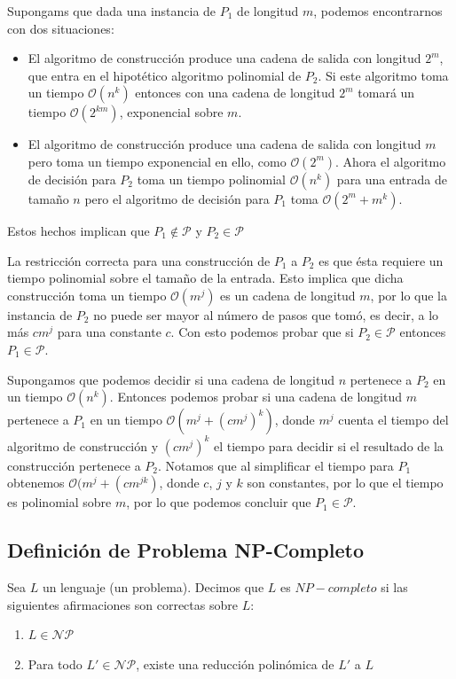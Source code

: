 \documentclass[a4paper]{article}
\begin{document}
Supongams que dada una instancia de $P_1$ de longitud $m$, podemos encontrarnos
con dos situaciones:
\begin{itemize}
  \item El algoritmo de construcción produce una cadena de salida con longitud
  $2^{m}$, que entra en el hipotético algoritmo polinomial de $P_2$. Si este
  algoritmo toma un tiempo $\mathcal{O}(n^k)$ entonces con una cadena de
  longitud $2^{m}$ tomará un tiempo $\mathcal{O}(2^{km})$, exponencial sobre $m$.
  \item El algoritmo de construcción produce una cadena de salida con longitud
  $m$ pero toma un tiempo exponencial en ello, como $\mathcal{O}(2^m)$. Ahora el
  algoritmo de decisión para $P_2$ toma un tiempo polinomial $\mathcal{O}(n^k)$
  para una entrada de tamaño $n$ pero el algoritmo de decisión para $P_1$ toma
  $\mathcal{O}(2^{m} + m^{k})$.
\end{itemize}
Estos hechos implican que $P_1 \notin \mathcal{P}$ y $P_2 \in \mathcal{P}$

La restricción correcta para una construcción de $P_1$ a $P_2$ es que  ésta requiere
un tiempo polinomial sobre el tamaño de la entrada.
Esto implica que dicha construcción toma un tiempo $\mathcal{O}(m^{j})$ es un
cadena de longitud $m$, por lo que la instancia de $P_2$ no puede ser mayor al
número de pasos que tomó, es decir, a lo más $cm^{j}$ para una constante $c$.
Con esto podemos probar que si $P_2 \in \mathcal{P}$ entonces $P_1 \in \mathcal{P}$.

Supongamos que podemos decidir si una cadena de longitud $n$ pertenece a $P_2$
en un tiempo $\mathcal{O}(n^{k})$. Entonces podemos probar si una cadena de
longitud $m$ pertenece a $P_1$ en un tiempo $\mathcal{O}(m^j + (cm^j)^k)$,
donde $m^j$ cuenta el tiempo del algoritmo de construcción y $(cm^j)^k$ el
tiempo para decidir si el resultado de la construcción pertenece a $P_2$.
Notamos que al simplificar el tiempo para $P_1$ obtenemos
$\mathcal{O}(m^j + (cm^{jk})$, donde $c$, $j$ y $k$ son constantes, por lo que
el tiempo es polinomial sobre $m$, por lo que podemos concluir que $P_1 \in \mathcal{P}$.

\subsection{Definición de Problema NP-Completo}
Sea $L$ un lenguaje (un problema). Decimos que $L$ es $NP-completo$ si las siguientes afirmaciones son correctas sobre $L$:
\begin{enumerate}
  \item $L \in \mathcal{NP}$
  \item Para todo $L' \in \mathcal{NP}$, existe una reducción polinómica de $L'$ a $L$
\end{enumerate}
\end{document}
